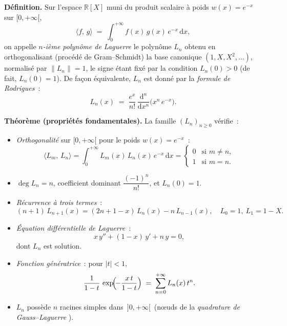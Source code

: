 

\newcommand{\psLag}[2]{\langle #1,\,#2\rangle}


\begin{tcolorbox}[thmbox]
  \textbf{Définition.}\enspace{}
  Sur l'espace $\mathbb{R}[X]$ muni du produit scalaire à poids
  $w(x)=e^{-x}$ sur $[0,+\infty[$,
  \[
    \psLag{f}{g} \;=\; \int_{0}^{+\infty} f(x)\,g(x)\,e^{-x}\,\mathrm{d}x,
  \]
  on appelle \emph{$n$-ième polynôme de Laguerre} le polynôme $L_n$ obtenu
  en orthogonalisant (procédé de Gram--Schmidt) la base canonique
  $(1,X,X^2,\ldots)$, normalisé par $\|L_n\|=1$, le signe étant fixé par la
  condition $L_n(0)>0$ (de fait, $L_n(0)=1$). De façon équivalente, $L_n$
  est donné par la \emph{formule de Rodrigues}~:
  \[
    L_n(x) \;=\; \frac{e^{x}}{n!}\,
    \frac{\mathrm{d}^n}{\mathrm{d}x^n}\!\bigl(x^n\,e^{-x}\bigr).
  \]

  \medskip
  \textbf{Théorème (propriétés fondamentales).}\enspace%
  La famille ${(L_n)}_{n\geq 0}$ vérifie~:
  \begin{itemize}
    \item \textit{Orthogonalité} sur $[0,+\infty[$ pour le poids
          $w(x)=e^{-x}$~:
    \[
      \psLag{L_m}{L_n} = \int_{0}^{+\infty} L_m(x)\,L_n(x)\,e^{-x}\,\mathrm{d}x
      = \begin{cases}
          0 & \text{si } m\neq n,\\[2pt]
          1 & \text{si } m=n.
        \end{cases}
    \]
    \item $\deg L_n = n$, coefficient dominant $\dfrac{{(-1)}^n}{n!}$, et
          $L_n(0)=1$.
    \item \textit{Récurrence à trois termes}~:
    \[
      (n+1)\,L_{n+1}(x) = (2n+1-x)\,L_n(x) - n\,L_{n-1}(x),
      \quad L_0=1,\ L_1=1-X.
    \]
    \item \textit{Équation différentielle de Laguerre}~:
    \[
      x\,y'' + (1-x)\,y' + n\,y = 0,
    \]
    dont $L_n$ est solution.
    \item \textit{Fonction génératrice}~: pour $|t|<1$,
    \[
      \frac{1}{1-t}\,\exp\!\Bigl(\!-\frac{x\,t}{1-t}\Bigr)
      \;=\; \sum_{n=0}^{+\infty} L_n(x)\,t^n.
    \]
    \item $L_n$ possède $n$ racines simples dans $\,]0,+\infty[\,$ (nœuds de
          la \emph{quadrature de Gauss--Laguerre}%
          ).
  \end{itemize}


\end{tcolorbox}
